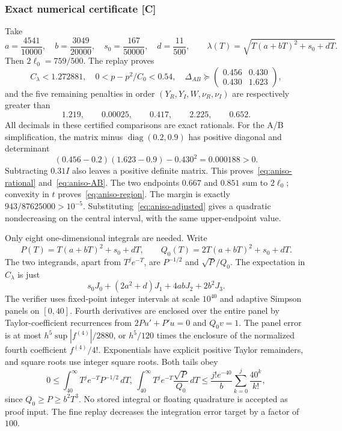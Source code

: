 \subsubsection{Exact numerical certificate [C]}
Take
\[
 a=\frac{4541}{10000},\quad b=\frac{3049}{20000},\quad
 s_0=\frac{167}{50000},\quad d=\frac{11}{500},\qquad
 \lambda(T)=\sqrt{T(a+bT)^2+s_0+dT}.
\]
Then $2\ell_0=759/500$. The replay proves
\[
 C_\lambda<1.272881,\quad 0<p-p^2/C_0<0.54,\quad
 \Delta_{AB}\succeq
 \begin{pmatrix}0.456&0.430\\0.430&1.623\end{pmatrix},
\]
and the five remaining penalties in order $(Y_R,Y_I,W,\nu_R,\nu_I)$
are respectively greater than
\[
 1.219,\qquad0.00025,\qquad0.417,\qquad2.225,\qquad0.652.
\]
All decimals in these certified comparisons are exact rationals.
For the A/B simplification, the matrix minus
$\operatorname{diag}(0.2,0.9)$ has positive diagonal and determinant
\[
 (0.456-0.2)(1.623-0.9)-0.430^2=0.000188>0.
\]
Subtracting $0.31I$ also leaves a positive definite matrix.
This proves~\eqref{eq:aniso-rational} and~\eqref{eq:aniso-AB}.
The two endpoints $0.667$ and $0.851$ sum to $2\ell_0$; convexity
in $t$ proves~\eqref{eq:aniso-region}. The margin is exactly
$943/87625000>10^{-5}$. Substituting~\eqref{eq:aniso-adjusted}
gives a quadratic nondecreasing on the central interval, with the same
upper-endpoint value.

Only eight one-dimensional integrals are needed. Write
\[
 P(T)=T(a+bT)^2+s_0+dT,\qquad
 Q_0(T)=2T(a+bT)^2+s_0+dT.
\]
The two integrands, apart from $T^je^{-T}$, are $P^{-1/2}$ and
$\sqrt P/Q_0$. The expectation in $C_\lambda$ is just
\[
 s_0J_0+(2a^2+d)J_1+4abJ_2+2b^2J_3.
\]
The verifier uses fixed-point integer intervals at scale $10^{40}$ and
adaptive Simpson panels on $[0,40]$. Fourth derivatives are enclosed over
the entire panel by Taylor-coefficient recurrences from
$2Pu'+P'u=0$ and $Q_0v=1$. The panel error is at most
$h^5\sup|f^{(4)}|/2880$, or $h^5/120$ times the enclosure of the
normalized fourth coefficient $f^{(4)}/4!$. Exponentials have explicit positive
Taylor remainders, and square roots use integer square roots.
Both tails obey
\[
 0\le\int_{40}^\infty T^je^{-T}P^{-1/2}\,dT,
 \ \int_{40}^\infty T^je^{-T}\frac{\sqrt P}{Q_0}\,dT
 \le\frac{j!e^{-40}}b\sum_{k=0}^j\frac{40^k}{k!},
\]
since $Q_0\ge P\ge b^2T^3$. No stored integral or floating quadrature
is accepted as proof input. The fine replay decreases the integration
error target by a factor of $100$.

